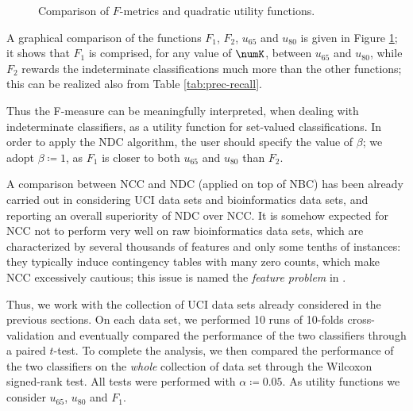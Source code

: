 \documentclass[a4paper,10pt,reqno]{amsart}
\theoremstyle{remark}
\begin{document}
\begin{figure}[!ht]
  \centering
  \caption{Comparison of $F$-metrics and quadratic utility functions.}
  \label{fig:f_metric_quad_utils}
\end{figure}

A graphical comparison of the functions $F_1$, $F_2$, $u_{65}$ and $u_{80}$ is given  in Figure \ref{fig:f_metric_quad_utils}; it shows that 
$F_1$ is comprised, for any value of  $\numK$, between $u_{65}$ and $u_{80}$, while $F_2$ rewards the indeterminate classifications much more  than the other functions;  this can be realized also from Table \ref{tab:prec-recall}. 

Thus the F-measure can be meaningfully interpreted, when dealing with indeterminate classifiers, as a utility function for set-valued classifications. In order to apply the NDC algorithm, the user should specify the value of $\beta$;  we adopt $\beta\coloneqq1$,  as $F_1$ is closer to both $u_{65}$ and $u_{80}$ than $F_2$.

A comparison between NCC and NDC (applied on top of NBC) has been already carried out in \cite{JdalCozlearning} considering UCI data sets and bioinformatics data sets, and reporting an overall superiority of NDC over NCC. 
It is somehow expected for NCC not to perform very well on raw bioinformatics data sets, which are characterized by several thousands of features and only some tenths of instances: they typically induce contingency tables with many zero counts, which make NCC excessively cautious; this issue is named the \textit{feature problem} in \cite{corani2010restricting}. 

Thus, we work with the collection of  UCI data sets already considered  in the previous sections. On each data set, we performed 10 runs of 10-folds cross-validation and eventually compared the performance of the two classifiers through a paired $t$-test. To complete the analysis,  we then compared the performance of the two classifiers on the \textit{whole} collection of data set through the Wilcoxon signed-rank test. All tests were performed with $\alpha\coloneqq0.05$. As utility functions we consider $u_{65}$, $u_{80}$ and $F_1$.
\end{document}
